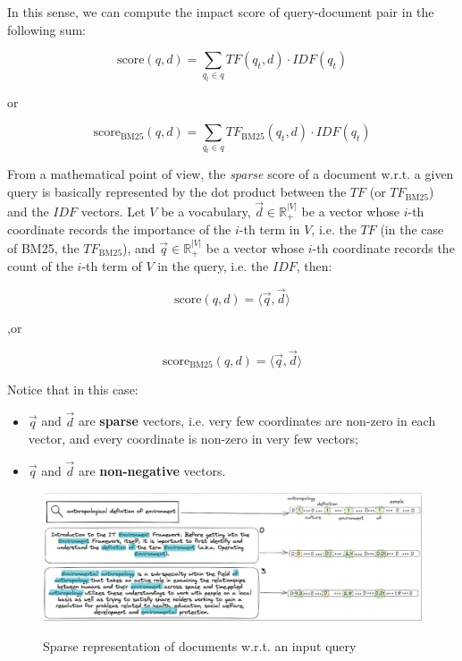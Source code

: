 In this sense, we can compute the impact score of query-document pair in the following sum:

$$
\text{score}(q,d) = \sum_{q_t \in q} TF(q_t,d) \cdot IDF(q_t)
$$

or

$$
\text{score}_{\text{BM25}}(q,d) = \sum_{q_t \in q} TF_{\text{BM25}}(q_t,d) \cdot IDF(q_t)
$$

From a mathematical point of view, the \textit{sparse} score of a document w.r.t. a given query is basically represented by the dot product between the $TF$ (or $TF_{\text{BM25}}$) and the $IDF$ vectors. Let $V$ be a vocabulary, $\Vec{d} \in \mathbb{R}_{+}^{|V|}$ be a vector whose $i$-th coordinate records the importance of the $i$-th term in $V$, i.e. the $TF$ (in the case of BM25, the $TF_{\text{BM25}}$), and $\Vec{q} \in \mathbb{R}_{+}^{|V|}$ be a vector whose $i$-th coordinate records the count of the $i$-th term of $V$ in the query, i.e. the $IDF$, then:

$$
\text{score}(q,d) = \langle \Vec{q}, \Vec{d} \rangle
$$

,or

$$
\text{score}_{\text{BM25}}(q,d) = \langle \Vec{q}, \Vec{d} \rangle
$$

Notice that in this case:

\begin{itemize}
    \item $\Vec{q}$ and $\Vec{d}$ are \textbf{sparse} vectors, i.e. very few coordinates are non-zero in each vector, and every coordinate is non-zero in very few vectors;
    \item $\Vec{q}$ and $\Vec{d}$ are \textbf{non-negative} vectors.
\end{itemize}

\begin{figure}[h!]
		\centering
		\includegraphics[scale = 1.2]{img/sparse.jpg}
        \label{sparse}
        \caption{Sparse representation of documents w.r.t. an input query}
\end{figure}

